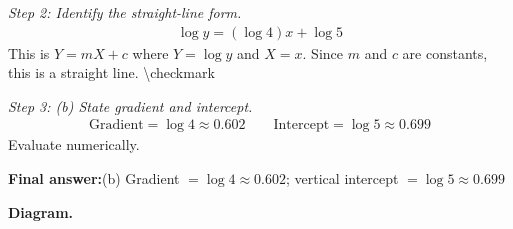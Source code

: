 \documentclass[11pt]{article}
\begin{document}
\textit{Step 2: Identify the straight-line form.}
\[\begin{gathered}
\log y = (\log 4)x + \log 5
\end{gathered}\]
This is \( Y = mX + c \) where \( Y = \log y \) and \( X = x \). Since \( m \) and \( c \) are constants, this is a straight line. \textbackslash checkmark

\textit{Step 3: (b) State gradient and intercept.}
\[\begin{gathered}
\text{Gradient} = \log 4 \approx 0.602 \qquad \text{Intercept} = \log 5 \approx 0.699
\end{gathered}\]
Evaluate numerically.

\begin{answerbox}
\textbf{Final answer:}\quad (b) Gradient \(\displaystyle  = \log 4 \approx 0.602 \); vertical intercept \(\displaystyle  = \log 5 \approx 0.699 \)
\end{answerbox}
\textbf{Diagram.}
\end{document}
